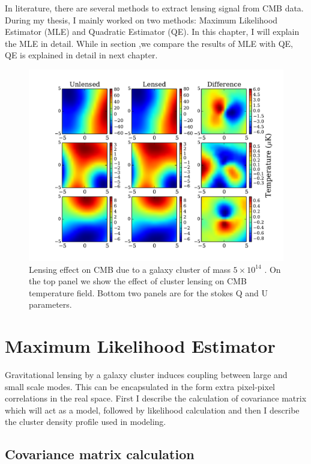 In literature, there are several methods to extract lensing signal from CMB data. 
During my thesis, I mainly worked on two methods: Maximum Likelihood Estimator (MLE) and Quadratic Estimator (QE). 
In this chapter, I will explain the MLE in detail. While in section ,we compare the results of MLE with QE, QE is explained in detail in next chapter.
\begin{figure}[t]
\begin{center}
\includegraphics[width=\linewidth, keepaspectratio]{figs/lensing_signal.pdf}
 \caption{Lensing effect on CMB due to a galaxy cluster of mass $5\times 10^{14}$ \msolar.
  On the top panel we show the effect of cluster lensing on CMB temperature field.
  Bottom two panels are for the stokes Q and U parameters. 
 } 
\label{fig:lensing_signal}
\end{center}
\end{figure}

\section{Maximum Likelihood Estimator}
\label{sec_MLE}
Gravitational lensing by a galaxy cluster induces coupling between large and small scale modes.
This can be encapsulated in the form extra pixel-pixel correlations in the real space. 
First I describe the calculation of covariance matrix which will act as a model, followed by likelihood calculation and then I describe the cluster density profile used in modeling. 


\subsection{Covariance matrix calculation}
\label{sec_covmat}

